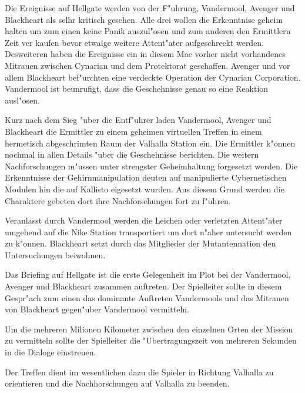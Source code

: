 
Die Ereignisse auf Hellgate werden von der F"uhrung, Vandermool, Avenger und Blackheart als selhr kritisch gesehen. Alle drei wollen die Erkenntnise geheim halten um zum einen keine Panik auszul"osen und zum anderen den Ermittlern Zeit ver kaufen bevor etwaige weitere Attent"ater aufgeschreckt werden. Desweiteren haben die Ereignisse ein in diesem Ma\3e vorher nicht vorhandenes Mi\3trauen zwischen Cynarian und dem Protektorat geschaffen. Avenger und vor allem Blackheart bef"urchten eine verdeckte Operation der Cynarian Corporation. Vandermool ist beunrufigt, dass die Geschehnisse genau so eine Reaktion ausl"osen.

Kurz nach dem Sieg "uber die Entf"uhrer laden Vandermool, Avenger und Blackheart die Ermittler zu einem geheimen virtuellen Treffen in einem hermetisch abgeschrimten Raum der Valhalla Station ein. Die Ermittler k"onnen nochmal in allen Details "uber die Geschehnisse berichten. Die weitern Nachforschungen m"ussen unter strengster Geheimhaltung forgesetzt werden. Die Erkenntnisse der Gehirnmanipulation deuten auf manipulierte Cybernetischen Modulen hin die auf Kallisto eigesetzt wurden. Aus diesem Grund werden die Charaktere gebeten dort ihre Nachforschungen fort zu f"uhren.

Veranlasst durch Vandermool werden die Leichen oder verletzten Attent"ater umgehend auf die Nike Station transportiert um dort n"aher untersucht werden zu k"onnen. Blackheart setzt durch das Mitglieder der Mutantennation den Untersuchungen beiwohnen.

\begin{remarks}
	Das Briefing auf Hellgate ist die erste Gelegenheit im Plot bei der Vandermool, Avenger und Blackheart zusammen auftreten. Der Spielleiter sollte in diesem Gespr"ach zum einen das dominante Auftreten Vandermools und das Mi\3trauen von Blackheart gegen"uber Vandermool vermitteln.

	Um die mehreren Milionen Kilometer zwischen den einzelnen Orten der Mission zu vermitteln sollte der Spielleiter die "Ubertragungszeit von mehreren Sekunden in die Dialoge einstreuen.

	Der Treffen dient im wesentlichen dazu die Spieler in Richtung Valhalla zu orientieren und die Nachhorschungen auf Valhalla zu beenden.
\end{remarks}


